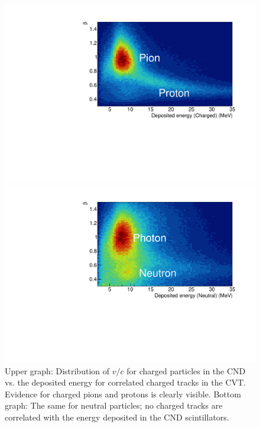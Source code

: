 \documentclass[final,3p,twocolumn]{elsarticle}
\begin{document}
\begin{figure}[t!]
\centerline{\includegraphics[width=1.\columnwidth]{CND-BetaE.pdf}}
\centerline{\includegraphics[width=1.\columnwidth]{CND-BetaENeutral.pdf}}
\caption{Upper graph: Distribution of $v/c$ for charged particles in the CND vs. the deposited energy for correlated
charged tracks in the CVT. Evidence for charged pions and protons is clearly visible.  Bottom graph: The same for
neutral particles; no charged tracks are correlated with the energy deposited in the CND scintillators.} 
\label{CND-neutrals}
\end{figure} 
\end{document}

